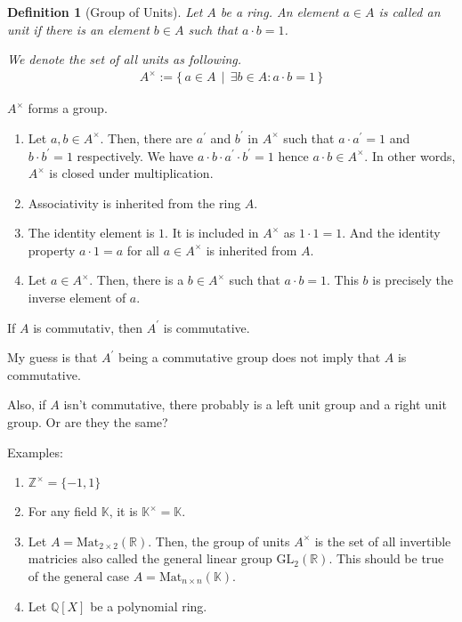 \documentclass{book}
\theoremstyle{custom_definition}
\newtheorem{definition}{Definition}
\theoremstyle{custom_theorem}
\begin{document}
    \begin{definition}[Group of Units]
        Let \(A\) be a ring. An element \(a \in A\) is called an unit if there is an element \(b \in A\) such that \(a \cdot b = 1\).

        We denote the set of all units as following.
        \begin{align}
            A^\times := \{\, a \in A \, \mid\, \exists b \in A : a \cdot b = 1 \,\}
        \end{align}
    \end{definition}

    \(A^\times\) forms a group.

    \begin{enumerate}
        \item Let \(a, b \in A^\times\). Then, there are \(a^\prime\) and \(b^\prime\) in \(A^\times\) such that \(a \cdot a^\prime = 1\) and \(b \cdot b^\prime = 1\) respectively. We have \(a \cdot b \cdot a^\prime \cdot b^\prime = 1\) hence \(a \cdot b \in A^\times\). In other words, \(A^\times\) is closed under multiplication.
        \item Associativity is inherited from the ring \(A\).
        \item The identity element is \(1\). It is included in \(A^\times\) as \(1 \cdot 1 = 1\). And the identity property \(a \cdot 1 = a\) for all \(a \in A^\times\) is inherited from \(A\).
        \item Let \(a \in A^\times\). Then, there is a \(b \in A^\times\) such that \(a \cdot b = 1\). This \(b\) is precisely the inverse element of \(a\).
    \end{enumerate}

    If \(A\) is commutativ, then \(A^\prime\) is commutative.

    My guess is that \(A^\prime\) being a commutative group does not imply that \(A\) is commutative.

    Also, if \(A\) isn't commutative, there probably is a left unit group and a right unit group. Or are they the same?

    Examples:

    \begin{enumerate}
        \item \(\mathbb{Z}^\times = \{ -1, 1 \}\)
        \item For any field \(\mathbb{K}\), it is \(\mathbb{K}^\times = \mathbb{K}\).
        \item Let \(A = \text{Mat}_{2 \times 2}(\mathbb{R})\). Then, the group of units \(A^\times\) is the set of all invertible matricies also called the general linear group \(\text{GL}_2(\mathbb{R})\). This should be true of the general case \(A = \text{Mat}_{n \times n}{(\mathbb{K})}\).
        \item Let \(\mathbb{Q}[X]\) be a polynomial ring.
    \end{enumerate}
\end{document}
